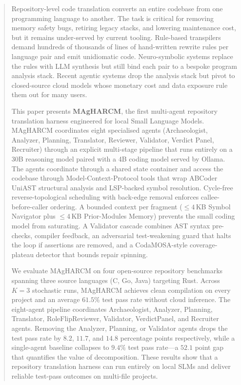 \begin{abstract}
Repository-level code translation converts an entire codebase from one
programming language to another. The task is critical for removing memory
safety bugs, retiring legacy stacks, and lowering maintenance cost, but it
remains under-served by current tooling. Rule-based transpilers demand
hundreds of thousands of lines of hand-written rewrite rules per
language pair and emit unidiomatic code. Neuro-symbolic systems replace
the rules with LLM synthesis but still bind each pair to a bespoke program
analysis stack. Recent agentic systems drop the analysis stack but pivot
to closed-source cloud models whose monetary cost and data exposure rule
them out for many users.

This paper presents \textbf{MAgHARCM}, the first multi-agent repository
translation harness engineered for local Small Language Models. MAgHARCM
coordinates eight specialised agents (Archaeologist, Analyzer, Planning,
Translator, Reviewer, Validator, Verdict Panel, Recruiter) through an
explicit multi-stage pipeline that runs entirely on a 30B reasoning model
paired with a 4B coding model served by Ollama. The agents coordinate
through a shared state container and access the codebase through
Model-Context-Protocol tools that wrap ABCoder UniAST structural analysis
and LSP-backed symbol resolution. Cycle-free
reverse-topological scheduling with back-edge removal enforces
callee-before-caller ordering. A bounded context per fragment ($\le 4$\,KB
Symbol Navigator plus $\le 4$\,KB Prior-Modules Memory) prevents the
small coding model from saturating. A Validator cascade combines AST
syntax pre-checks, compiler feedback, an adversarial test-weakening guard
that halts the loop if assertions are removed, and a CodaMOSA-style
coverage-plateau detector that bounds repair spinning.

We evaluate MAgHARCM on four open-source repository benchmarks spanning
three source languages (C, Go, Java) targeting Rust. Across $K{=}3$
stochastic runs, MAgHARCM achieves clean compilation on every project
and an average $61.5\%$ test pass rate without cloud inference. The
eight-agent pipeline coordinates Archaeologist, Analyzer, Planning,
Translator, RoleFlipReviewer, Validator, VerdictPanel, and Recruiter
agents. Removing the Analyzer, Planning, or Validator agents drops
the test pass rate by $8.2$, $11.7$, and $14.8$ percentage points
respectively, while a single-agent baseline collapses to $9.4\%$
test pass rate---a $52.1$ point gap that quantifies the value of
decomposition. These results show
that a repository translation harness can run entirely on local SLMs and
deliver reliable test-pass outcomes on multi-file projects.
\end{abstract}
